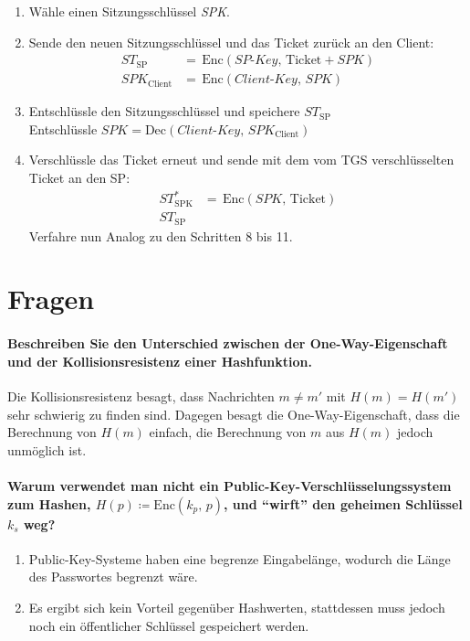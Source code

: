 \documentclass[a4paper, 11pt, accentcolor = tud3b]{tudreport}
\newcommand{\Enc}{\ensuremath{\textrm{Enc}}}
\newcommand{\Dec}{\ensuremath{\textrm{Dec}}}
\begin{document}
\begin{enumerate}
				    \item Wähle einen Sitzungsschlüssel \textit{SPK}.
				    \item Sende den neuen Sitzungsschlüssel und das Ticket zurück an den Client:
					    \begin{align*}
					    	\textit{ST}_\textrm{SP}      & =\, \Enc(\textit{SP-Key},\, \textrm{Ticket}+\textit{SPK}) \\
					    	\textit{SPK}_\textrm{Client} & =\, \Enc(\textit{Client-Key},\, \textit{SPK})
					    \end{align*}
					\item Entschlüssle den Sitzungsschlüssel und speichere \( \textit{ST}_\textrm{SP} \) \\ Entschlüssle \( \textit{SPK} = \Dec(\textit{Client-Key},\, \textit{SPK}_\textrm{Client}) \)
					\item Verschlüssle das Ticket erneut und sende mit dem vom TGS verschlüsselten Ticket an den SP:
						\begin{align*}
							\textit{ST}^*_\textrm{SPK} & =\, \Enc(\textit{SPK},\, \textrm{Ticket}) \\
							\textit{ST}_\textrm{SP}    &
						\end{align*}
						Verfahre nun Analog zu den Schritten 8 bis 11.
	            \end{enumerate}

        \section{Fragen} %
			\paragraph{Beschreiben Sie den Unterschied zwischen der One-Way-Eigenschaft und der Kollisionsresistenz einer Hashfunktion.}
			Die Kollisionsresistenz besagt, dass Nachrichten \( m \neq m' \) mit \( H(m) = H(m') \) sehr schwierig zu finden sind. Dagegen besagt die One-Way-Eigenschaft, dass die Berechnung von \( H(m) \) einfach, die Berechnung von \(m\) aus \(H(m)\) jedoch unmöglich ist.
			
			\paragraph{Warum verwendet man nicht ein Public-Key-Verschlüsselungssystem zum Hashen, \(H(p) \coloneqq \Enc(k_p,\, p) \), und \enquote{wirft} den geheimen Schlüssel \(k_s\) weg?}
			\begin{enumerate}
				\item Public-Key-Systeme haben eine begrenze Eingabelänge, wodurch die Länge des Passwortes begrenzt wäre.
				\item Es ergibt sich kein Vorteil gegenüber Hashwerten, stattdessen muss jedoch noch ein öffentlicher Schlüssel gespeichert werden.
			\end{enumerate}
			
\end{document}
